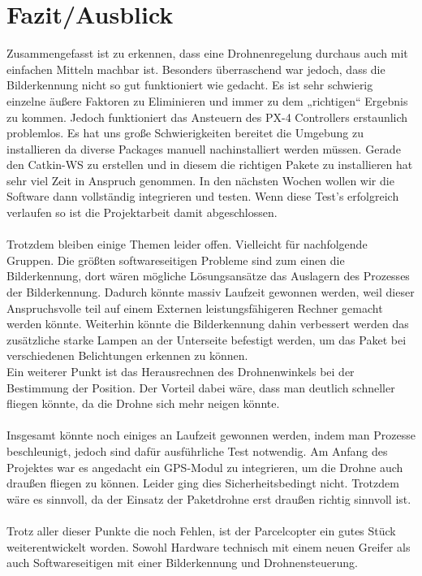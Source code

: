 \chapter{Fazit/Ausblick}
\label{fazit}
Zusammengefasst ist zu erkennen, dass eine Drohnenregelung durchaus auch mit einfachen Mitteln machbar ist. Besonders überraschend war jedoch, dass die Bilderkennung nicht so gut funktioniert wie gedacht. Es ist sehr schwierig einzelne äußere Faktoren zu Eliminieren und immer zu dem „richtigen“ Ergebnis zu kommen. Jedoch funktioniert das Ansteuern des PX-4 Controllers erstaunlich problemlos. Es hat uns große Schwierigkeiten bereitet die Umgebung zu installieren da diverse Packages manuell nachinstalliert werden müssen. Gerade den Catkin-WS zu erstellen und in diesem die richtigen Pakete zu installieren hat sehr viel Zeit in Anspruch genommen.
In den nächsten Wochen wollen wir die Software dann vollständig integrieren und testen. Wenn diese Test's erfolgreich verlaufen so ist die Projektarbeit damit abgeschlossen.\\
\\
Trotzdem bleiben einige Themen leider offen. Vielleicht für nachfolgende Gruppen.
Die größten softwareseitigen Probleme sind zum einen die Bilderkennung, dort wären mögliche Lösungsansätze das Auslagern des Prozesses der Bilderkennung. Dadurch könnte massiv Laufzeit gewonnen werden, weil dieser Anspruchsvolle teil auf einem Externen leistungsfähigeren Rechner gemacht werden könnte. 
Weiterhin könnte die Bilderkennung dahin verbessert werden das zusätzliche starke Lampen an der Unterseite befestigt werden, um das Paket bei verschiedenen Belichtungen erkennen zu können.\\
Ein weiterer Punkt ist das Herausrechnen des Drohnenwinkels bei der Bestimmung der Position. Der Vorteil dabei wäre, dass man deutlich schneller fliegen könnte, da die Drohne sich mehr neigen könnte.\\
\\
Insgesamt könnte noch einiges an Laufzeit gewonnen werden, indem man Prozesse beschleunigt, jedoch sind dafür ausführliche Test notwendig.
Am Anfang des Projektes war es angedacht ein GPS-Modul zu integrieren, um die Drohne auch draußen fliegen zu können. Leider ging dies Sicherheitsbedingt nicht. Trotzdem wäre es sinnvoll, da der Einsatz der Paketdrohne erst draußen richtig sinnvoll ist.\\
\\
Trotz aller dieser Punkte die noch Fehlen, ist der Parcelcopter ein gutes Stück weiterentwickelt worden. Sowohl Hardware technisch mit einem neuen Greifer als auch Softwareseitigen mit einer Bilderkennung und Drohnensteuerung.\\
\\
